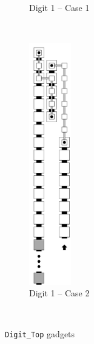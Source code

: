\begin{figure}[H]
\begin{subfigure}[t]{0.2\textwidth}
            \caption{\label{fig:digit_top_case1_digit1_msr} Digit 1 -- Case 1}
        \end{subfigure}%
        ~
        \begin{subfigure}[t]{0.2\textwidth}
            \centering
            \includegraphics[width=0.2\textwidth]{digit_top_case2_digit1_msr}
            \caption{\label{fig:digit_top_case2_digit1_msr} Digit 1 -- Case 2}
        \end{subfigure}%
        ~
        \caption{\label{fig:digit_tops} {\tt Digit\_Top} gadgets}
    \end{figure}

\vspace{1cm}
